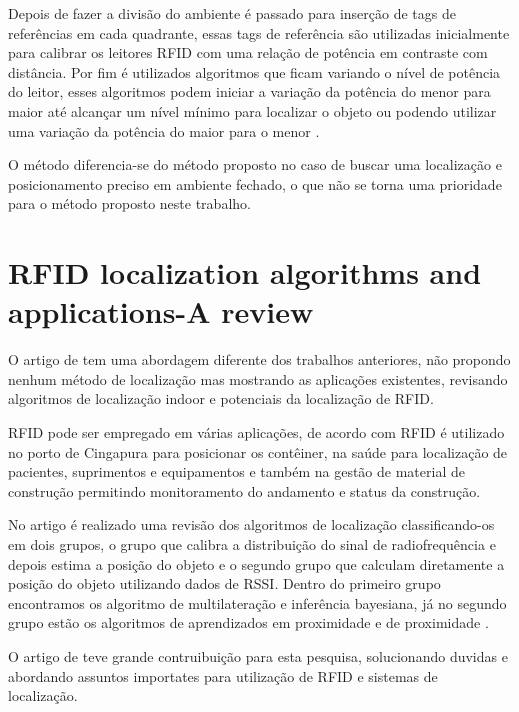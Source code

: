 \par
Depois de fazer a divisão do ambiente é passado para inserção de tags de referências em cada quadrante, essas tags de referência são utilizadas inicialmente para calibrar os leitores RFID com uma relação de potência em contraste com distância. Por fim é utilizados algoritmos que ficam variando o nível de potência do leitor, esses algoritmos podem iniciar a variação da potência do menor para maior até alcançar um nível mínimo para localizar o objeto ou podendo utilizar uma variação da potência do maior para o menor \cite{localization2010}.

\par
O método \citeauthor{localization2010} diferencia-se do método proposto no caso de buscar uma localização e posicionamento preciso em ambiente fechado, o que não se torna uma prioridade para o método proposto neste trabalho.


\section{RFID localization algorithms and applications-A review}
O artigo de \citeauthor{rfid2009review} tem uma abordagem diferente dos trabalhos anteriores, não propondo nenhum método de localização mas mostrando as aplicações existentes, revisando algoritmos de localização indoor e potenciais da localização de RFID.
\par
RFID pode ser empregado em várias aplicações, de acordo com \citeauthor{rfid2009review} RFID é utilizado no porto de Cingapura para posicionar os contêiner, na saúde para localização de pacientes, suprimentos e equipamentos  e também na gestão de material de construção permitindo monitoramento do andamento e status da construção.
\par
No artigo é realizado uma revisão dos algoritmos de localização classificando-os em dois grupos, o grupo que calibra a distribuição do sinal de radiofrequência e depois estima a posição do objeto e o segundo grupo que calculam diretamente a posição do objeto utilizando dados de RSSI. Dentro do primeiro grupo encontramos os algoritmo de multilateração e inferência bayesiana, já no segundo grupo estão os algoritmos de aprendizados em proximidade e de proximidade \cite{rfid2009review}.
\par
O artigo de \citeauthor{rfid2009review} teve grande contruibuição para esta pesquisa, solucionando duvidas e abordando assuntos importates para utilização de RFID e sistemas de localização.
